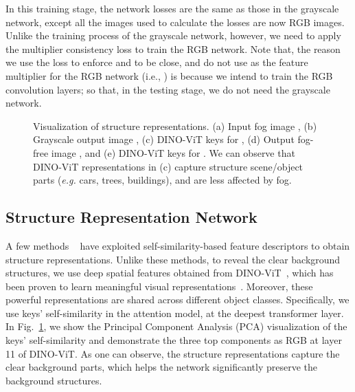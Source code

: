 \documentclass[runningheads]{llncs}
\begin{document}
In this training stage, the network losses are the same as those in the grayscale network, except all the images used to calculate the losses are now RGB images.  
Unlike the training process of the grayscale network, however, we need to apply the multiplier consistency loss  to train the RGB network.
Note that, the reason we use the loss to enforce  and  to be close, and do not use  as the feature multiplier for the RGB network (i.e., ) is  because we intend to train the RGB convolution layers; 
so that, in the testing stage, we do not need the grayscale network. 

\begin{figure}[t]
	\centering
\setcounter{subfigure}{0}
	\hfill
	\hfill
	\hfill
	\hfill
	\hfill
	\caption{Visualization of structure representations.
		(a) Input fog image , 
		(b) Grayscale output image ,
		(c) DINO-ViT keys for , 
		(d) Output fog-free image , 
		and (e) DINO-ViT keys for . 
		We can observe that DINO-ViT representations in (c) capture structure scene/object parts (\textit{e.g.} cars, trees, buildings), and are less affected by fog.}
	\label{fig:structure}
\end{figure}

\subsection{Structure Representation Network}
A few methods ~\cite{shechtman2007matching,zheng2021spatially,kolkin2019style,jin2022unsupervised} have exploited self-similarity-based feature descriptors to obtain structure representations. 
Unlike these methods, to reveal the clear background structures, we use deep spatial features obtained from DINO-ViT~\cite{tumanyan2022splicing}, which has been proven to learn meaningful visual representations~\cite{amir2021deep}. Moreover, these powerful representations are shared across different object classes.
Specifically, we use keys' self-similarity in the attention model, at the deepest transformer layer.
In Fig.~\ref{fig:structure}, we show the Principal Component Analysis (PCA) visualization of the keys' self-similarity and demonstrate the three top components as RGB at layer 11 of DINO-ViT. 
As one can observe, the structure representations capture the clear background parts, which helps the network significantly preserve the background structures.  
\end{document}
